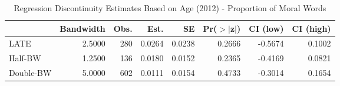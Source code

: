 \begin{table}[ht]
\centering
\begin{tabular}{lrrrrrrr}
  \hline
 & Bandwidth & Obs. & Est. & SE & Pr($>$$|$z$|$) & CI (low) & CI (high) \\ 
  \hline
LATE & 2.5000 & 280 & 0.0264 & 0.0238 & 0.2666 & -0.5674 & 0.1002 \\ 
  Half-BW & 1.2500 & 136 & 0.0180 & 0.0152 & 0.2365 & -0.4169 & 0.0821 \\ 
  Double-BW & 5.0000 & 602 & 0.0111 & 0.0154 & 0.4733 & -0.3014 & 0.1654 \\ 
   \hline
\end{tabular}
\caption{Regression Discontinuity Estimates Based on Age (2012) - Proportion of Moral Words} 
\label{tab:Xrd2012y}
\end{table}
